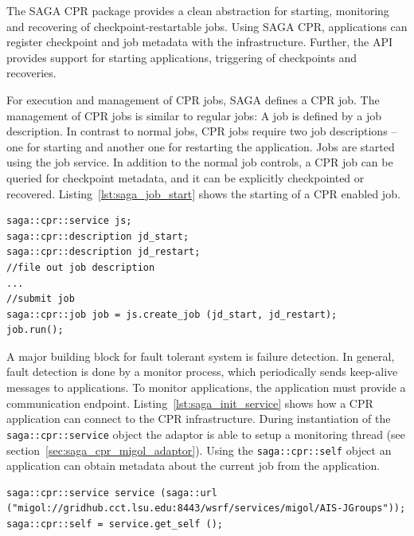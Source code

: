 \documentclass[times, 10pt,twocolumn]{article}
\begin{document}
                                                                                                         
The SAGA CPR package provides a clean abstraction for starting,
monitoring and recovering of checkpoint-restartable jobs.
Using SAGA CPR, applications can register checkpoint and job metadata with the infrastructure. 
Further, the API provides support for starting applications, triggering of checkpoints and recoveries.  

For execution and management of CPR jobs, SAGA defines a CPR job. The management of 
CPR jobs is similar to regular jobs: A job is defined by a job description. In contrast to normal jobs, 
CPR jobs require  two job descriptions -- one for starting and another one for restarting the application.
Jobs are started using the job service. In addition to the normal job controls, a CPR job can be queried for checkpoint metadata, and 
it can be explicitly checkpointed or recovered. Listing~\ref{lst:saga_job_start} shows the starting of a CPR enabled job.

\begin{lstlisting}[style=myListing, caption={SAGA CPR: Starting a Job with CPR Support},  label={lst:saga_job_start}]
saga::cpr::service js; 
saga::cpr::description jd_start;
saga::cpr::description jd_restart;
//file out job description
...
//submit job  
saga::cpr::job job = js.create_job (jd_start, jd_restart);
job.run();
\end{lstlisting}
    
A major building block for fault tolerant system is failure detection. In general, fault detection is done by a monitor process, 
which periodically sends keep-alive messages to applications. To monitor applications, the application must provide a communication endpoint.
Listing~\ref{lst:saga_init_service} shows how a CPR application can connect to the CPR infrastructure. During instantiation of the \texttt{saga::cpr::service} object the adaptor is able to setup a monitoring thread (see section~\ref{sec:saga_cpr_migol_adaptor}). Using the \texttt{saga::cpr::self} object an application can obtain metadata about the current job from the application.                                                                               
\begin{lstlisting}[style=myListing, caption={SAGA CPR: Initialize Migol Session}, label={lst:saga_init_service}]
saga::cpr::service service (saga::url ("migol://gridhub.cct.lsu.edu:8443/wsrf/services/migol/AIS-JGroups"));
saga::cpr::self = service.get_self ();
\end{lstlisting}
      
\end{document}
